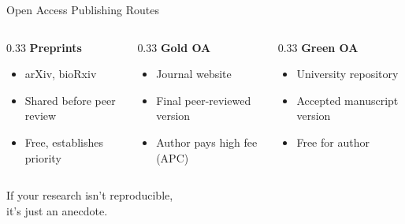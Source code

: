 \documentclass[aspectratio=169]{beamer}
\begin{document}
\begin{frame}{Open Access Publishing Routes}
  \begin{columns}[T]
    \begin{column}{0.33\textwidth}
      \textbf{Preprints}
      \begin{itemize}
        \item arXiv, bioRxiv
        \item Shared before peer review
        \item Free, establishes priority
      \end{itemize}
    \end{column}
    \begin{column}{0.33\textwidth}
      \textbf{Gold OA}
      \begin{itemize}
        \item Journal website
        \item Final peer-reviewed version
        \item Author pays high fee (APC)
      \end{itemize}
    \end{column}
    \begin{column}{0.33\textwidth}
      \textbf{Green OA}
      \begin{itemize}
        \item University repository
        \item Accepted manuscript version
        \item Free for author
      \end{itemize}
    \end{column}
  \end{columns}
\end{frame}

\begin{frame}[standout]
  If your research isn't reproducible,\\
  it's just an anecdote.
\end{frame}
\end{document}
